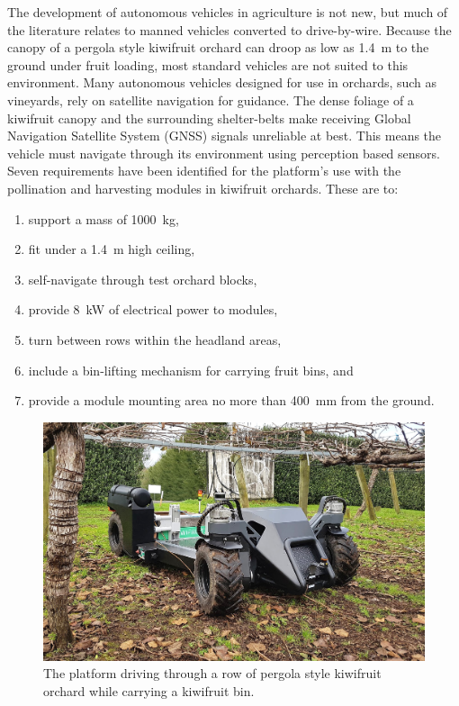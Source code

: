\documentclass[preprint,authoryear,12pt]{elsarticle}
\begin{document}
    The development of autonomous vehicles in agriculture is not new, but much of the literature relates to manned vehicles converted to drive-by-wire.
    Because the canopy of a pergola style kiwifruit orchard can droop as low as \SI{1.4}{\meter} to the ground under fruit loading, most standard vehicles are not suited to this environment.
    Many autonomous vehicles designed for use in orchards, such as vineyards, rely on satellite navigation for guidance.
    The dense foliage of a kiwifruit canopy and the surrounding shelter-belts make receiving Global Navigation Satellite System (GNSS) signals unreliable at best.
    This means the vehicle must navigate through its environment using perception based sensors.
    Seven requirements have been identified for the platform's use with the pollination and harvesting modules in kiwifruit orchards.
    These are to:
    \begin{enumerate}
        \item support a mass of \SI{1000}{\kilo\gram},
        \item fit under a \SI{1.4}{\meter} high ceiling,
        \item self-navigate through test orchard blocks,
        \item provide \SI{8}{\kilo\watt} of electrical power to modules,
        \item turn between rows within the headland areas,
        \item include a bin-lifting mechanism for carrying fruit bins, and
        \item provide a module mounting area no more than \SI{400}{\milli\meter} from the ground.
    \end{enumerate}
    \begin{figure}[htb]
        \centering
        \includegraphics[width=\linewidth]{imgs/photos/suzy_general.jpg}
        \caption{
            The platform driving through a row of pergola style kiwifruit orchard while carrying a kiwifruit bin.
        }
        \label{fig:suzy}
    \end{figure}
\end{document}
